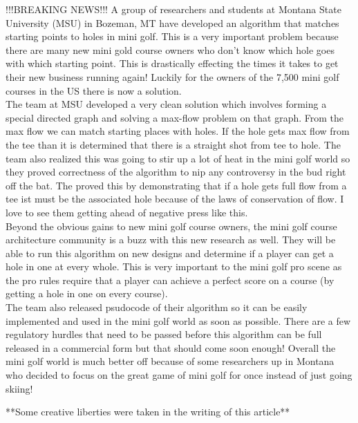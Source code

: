 \documentclass{article}
\begin{document}
	!!!BREAKING NEWS!!! A group of researchers and students at Montana State University (MSU) in Bozeman, MT have developed an algorithm that matches starting points to holes in mini golf. This is a very important problem because there are many new mini gold course owners who don't know which hole goes with which starting point. This is drastically effecting the times it takes to get their new business running again! Luckily for the owners of the 7,500 mini golf courses in the US there is now a solution. \\
	The team at MSU developed a very clean solution which involves forming a special directed graph and solving a max-flow problem on that graph. From the max flow we can match starting places with holes. If the hole gets max flow from the tee than it is determined that there is a straight shot from tee to hole. The team also realized this was going to stir up a lot of heat in the mini golf world so they proved correctness of the algorithm to nip any controversy in the bud right off the bat. The proved this by demonstrating that if a hole gets full flow from a tee ist must be the associated hole because of the laws of conservation of flow. I love to see them getting ahead of negative press like this. \\
	Beyond the obvious gains to new mini golf course owners, the mini golf course architecture community is a buzz with this new research as well. They will be able to run this algorithm on new designs and determine if a player can get a hole in one at every whole. This is very important to the mini golf pro scene as the pro rules require that a player can achieve a perfect score on a course (by getting a hole in one on every course). \\ The team also released psudocode of their algorithm so it can be easily implemented and used in the mini golf world as soon as possible. There are a few regulatory hurdles that need to be passed before this algorithm can be full released in a commercial form but that should come soon enough! Overall the mini golf world is much better off because of some researchers up in Montana who decided to focus on the great game of mini golf for once instead of just going skiing! 
	
	**Some creative liberties were taken in the writing of this article**
	
	


\newpage



\end{document}
